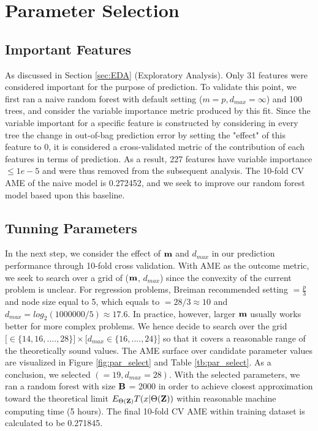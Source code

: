 \documentclass[11pt]{article}
\theoremstyle{definition}
\begin{document}
\section{\textbf{Parameter Selection}}
\subsection{\textbf{Important Features}}

As discussed in Section \ref{sec:EDA} (Exploratory Analysis). Only 31 features were considered important for the purpose of prediction. To validate this point, we first ran a naive random forest with default setting ($m = p, d_{max} = \infty$) and 100 trees, and consider the variable importance metric produced by this fit. Since the variable important for a specific feature  is constructed by considering in every tree the change in out-of-bag prediction error by setting the "effect" of this feature to 0, it is considered a cross-validated metric of the contribution of each features in terms of prediction. As a result, 227 features have variable importance $\leq 1e-5$ and were thus removed from the subsequent analysis. The 10-fold CV AME of the naive model is 0.272452, and we seek to improve our random forest model based upon this baseline.

\subsection{\textbf{Tunning Parameters}}
In the next step, we consider the effect of ${\bf m}$ and $d_{max}$ in our prediction performance through 10-fold cross validation. With AME as the outcome metric, we seek to search over a grid of (${\bf m}$, $d_{max}$) since the convexity of the current problem is unclear. For regression problems, Breiman recommended setting $\bm = \frac{p}{3}$ and node size equal to 5, which equals to $\bm = 28/3 \approx 10$ and $d_{max} = log_2(1000000/5) \approx 17.6$. In practice, however, larger ${\bf m}$ usually works better for more complex problems. We hence decide to search over the grid $\big[ \bm \in \{14, 16, ...., 28\} \big] \times \big[ d_{max} \in \{16, ...., 24\} \big]$ so that it covers a reasonable range of the theoretically sound values. The AME surface over candidate parameter values are visualized in Figure \ref{fig:par_select} and Table \ref{tb:par_select}. As a conclusion, we selected $(\bm = 19, d_{max} = 28)$. With the selected parameters, we ran a random forest with size ${\bf B}$ = 2000 in order to achieve closest approximation toward the theoretical limit $E_{\Theta({\bf Z})}T(x|\Theta({\bf Z}))$ within reasonable machine computing time (5 hours). The final 10-fold CV AME within training dataset is calculated to be 0.271845.
\end{document}
